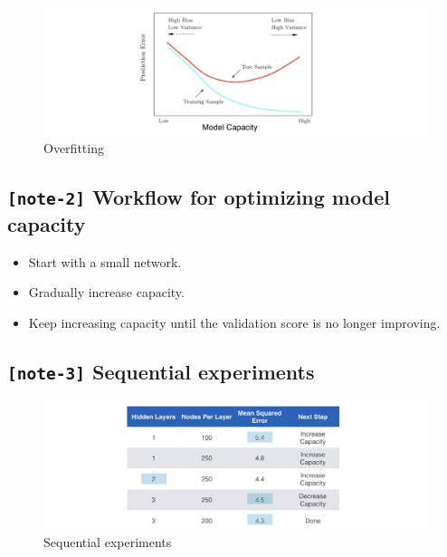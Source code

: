 \documentclass[11pt, twoside]{article}
\begin{document}
\begin{figure}
\centering
\includegraphics{../Figures/3. Overfitting.jpg}
\caption{Overfitting}
\end{figure}

    \hypertarget{note-2-workflow-for-optimizing-model-capacity}{%
\subsection{\texorpdfstring{\texttt{{[}note-2{]}} Workflow for
optimizing model
capacity}{{[}note-2{]} Workflow for optimizing model capacity}}\label{note-2-workflow-for-optimizing-model-capacity}}

\begin{itemize}
\item
  Start with a small network.
\item
  Gradually increase capacity.
\item
  Keep increasing capacity until the validation score is no longer
  improving.
\end{itemize}

    \hypertarget{note-3-sequential-experiments}{%
\subsection{\texorpdfstring{\texttt{{[}note-3{]}} Sequential
experiments}{{[}note-3{]} Sequential experiments}}\label{note-3-sequential-experiments}}

\begin{figure}
\centering
\includegraphics{../Figures/4. Sequential experiments.jpg}
\caption{Sequential experiments}
\end{figure}
\end{document}
